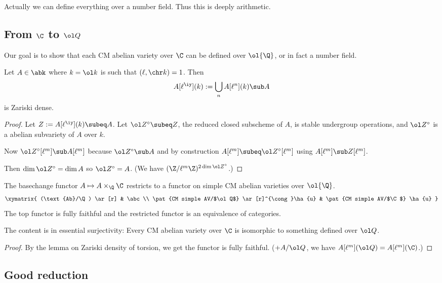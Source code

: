 Actually we can define everything over a number field. Thus this is deeply arithmetic.
\subsection{From $\C$ to $\ol Q$}
Our goal is to show that each CM abelian variety over $\C$ can be defined over $\ol{\Q}$, or in fact a number field. 
\begin{lem}
Let $A\in \abk$ where $k=\ol k$ is such that $(\ell,\chr k)=1$. Then 
\[
A[\ell^{\iy}](k):=\bigcup_n A[\ell^n](k)\sub A
\]
is Zariski dense.
\end{lem}
\begin{proof}
Let $Z:=A[\ell^{\iy}](k)\subeq A$. Let %
$\ol Z^{\circ}\subeq Z$, the reduced closed subscheme of $A$, is stable undergroup operations, and $\ol Z^{\circ}$ is a abelian subvariety of $A$ over $k$. 

Now $\ol Z^{\circ}[\ell^m]\sub A[\ell^m]$ because $\ol Z^{\circ}\sub A$ and by construction $A[\ell^m]\subeq \ol Z^{\circ}[\ell^m]$ using $A[\ell^m]\sub Z[\ell^m]$. 

Then $\dim\ol Z^{\circ}=\dim A$ so $\ol Z^{\circ} =A$. (We have $(\Z/\ell^m\Z)^{2\dim \ol Z^{\circ}}$.)
\end{proof}
\begin{pr}
The basechange functor $A\mapsto A\times_{\Q}\C$ restricts to a functor on simple CM abelian varieties over $\ol{\Q}$.
\[
\xymatrix{
(\text{Ab}/\Q) \ar[r] & \abc\\
\pat{CM simple AV/$\ol Q$} \ar[r]^{\cong}\ha{u} & \pat{CM simple AV/$\C$} \ha{u}
}
\]
The top functor is fully faithful and the restricted functor is an equivalence of categories.
\end{pr}
The content is in essential surjectivity: Every CM abelian  variety over $\C$ is isomorphic to something defined over $\ol Q$. %
\begin{proof}
By the lemma on Zariski density of torsion, we get the functor is fully faithful. ($+A/\ol Q$, we have $A[\ell^m](\ol Q)=A[\ell^m](\C)$.) 

\end{proof}
\subsection{Good reduction}

